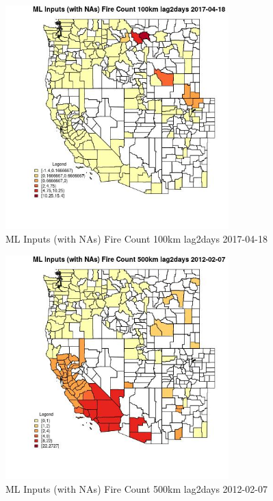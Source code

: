 \begin{figure} 
\centering  
\includegraphics[width=0.77\textwidth]{Code_Outputs/Report_ML_input_PM25_Step4_part_f_de_duplicated_aves_prioritize_24hr_obswNAs_CountyFire_Count_100km_lag2daysMean2017-04-18.jpg} 
\caption{\label{fig:Report_ML_input_PM25_Step4_part_f_de_duplicated_aves_prioritize_24hr_obswNAsCountyFire_Count_100km_lag2daysMean2017-04-18}ML Inputs (with NAs) Fire Count 100km lag2days 2017-04-18} 
\end{figure} 
 

\begin{figure} 
\centering  
\includegraphics[width=0.77\textwidth]{Code_Outputs/Report_ML_input_PM25_Step4_part_f_de_duplicated_aves_prioritize_24hr_obswNAs_CountyFire_Count_500km_lag2daysMean2012-02-07.jpg} 
\caption{\label{fig:Report_ML_input_PM25_Step4_part_f_de_duplicated_aves_prioritize_24hr_obswNAsCountyFire_Count_500km_lag2daysMean2012-02-07}ML Inputs (with NAs) Fire Count 500km lag2days 2012-02-07} 
\end{figure} 
 

